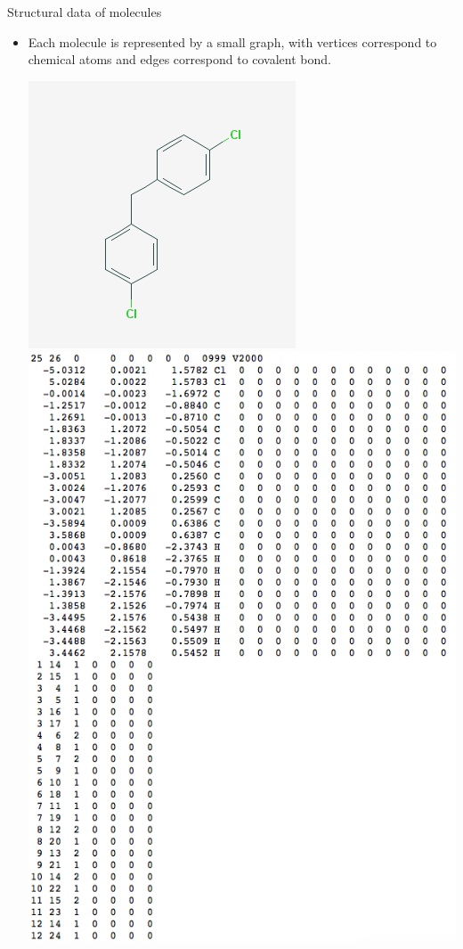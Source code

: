 \documentclass[first=dgreen,second=purple,logo=yellowexc]{aaltoslides}
\begin{document}
{\begin{frame}{Structural data of molecules}
	\begin{itemize}
		\item Each molecule is represented by a small graph, with vertices correspond to chemical atoms and edges correspond to covalent bond.
		\begin{center}
			\includegraphics[scale=0.2]{./figures/cpd.png}
			\text{   }
			\includegraphics[scale=0.2]{./figures/cpd_sdf.png}
		\end{center}
		

\end{itemize}
\end{frame}}
\end{document}
